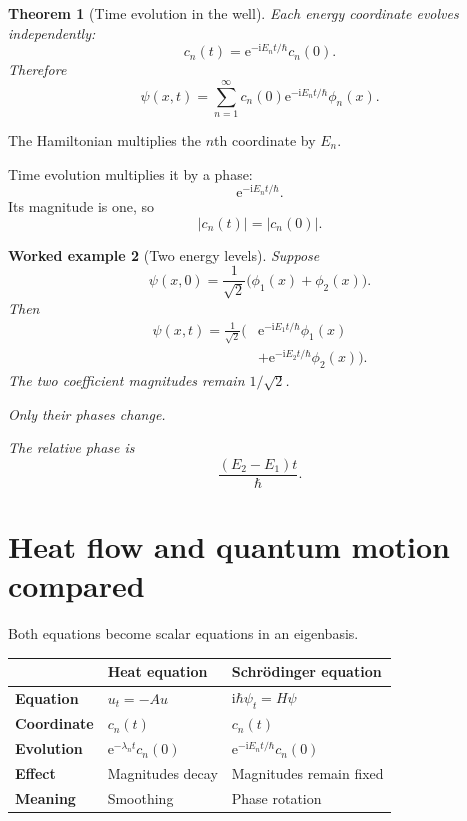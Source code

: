 \documentclass[11pt,a5paper,oneside,openany]{scrreprt}
\theoremstyle{notes}
\newtheorem{theorem}{Theorem}[section]
\theoremstyle{definitions}
\newtheorem{example}[theorem]{Worked example}
\newcommand{\e}{\mathrm{e}}
\begin{document}
\begin{theorem}[Time evolution in the well]
Each energy coordinate evolves independently:
\[
 \boxed{
 c_n(t)
 =\e^{-\mathrm iE_nt/\hbar}c_n(0).}
\]
Therefore
\[
 \boxed{
 \psi(x,t)
 =\sum_{n=1}^{\infty}
 c_n(0)\e^{-\mathrm iE_nt/\hbar}\phi_n(x).}
\]
\end{theorem}

The Hamiltonian multiplies the $n$th coordinate by $E_n$.

Time evolution multiplies it by a phase:
\[
 \e^{-\mathrm iE_nt/\hbar}.
\]
Its magnitude is one, so
\[
 |c_n(t)|=|c_n(0)|.
\]

\begin{example}[Two energy levels]
Suppose
\[
 \psi(x,0)
 =\frac1{\sqrt2}
 \bigl(\phi_1(x)+\phi_2(x)\bigr).
\]
Then
\[
 \begin{aligned}
 \psi(x,t)
 =\frac1{\sqrt2}\bigl(
 &\e^{-\mathrm iE_1t/\hbar}\phi_1(x)\\
 &+\e^{-\mathrm iE_2t/\hbar}\phi_2(x)
 \bigr).
 \end{aligned}
\]
The two coefficient magnitudes remain $1/\sqrt2$.

Only their phases change.

The relative phase is
\[
 \frac{(E_2-E_1)t}{\hbar}.
\]
\end{example}

\section{Heat flow and quantum motion compared}

Both equations become scalar equations in an eigenbasis.

\begin{center}
\renewcommand{\arraystretch}{1.45}
\begin{tabularx}{\textwidth}{@{}>{\bfseries}p{}XX@{}}
\toprule
 & Heat equation & Schr\"odinger equation\\
\midrule
Equation
& $u_t=-Au$
& $\mathrm i\hbar\psi_t=H\psi$\\
Coordinate
& $c_n(t)$
& $c_n(t)$\\
Evolution
& $\e^{-\lambda_nt}c_n(0)$
& $\e^{-\mathrm iE_nt/\hbar}c_n(0)$\\
Effect
& Magnitudes decay
& Magnitudes remain fixed\\
Meaning
& Smoothing
& Phase rotation\\
\bottomrule
\end{tabularx}
\end{center}
\end{document}
